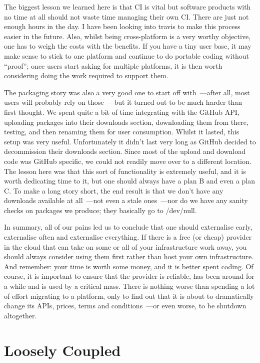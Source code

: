 \documentclass{book}
\begin{document}
The biggest lesson we learned here is that CI is vital but software
products with no time at all should not waste time managing their own
CI. There are just not enough hours in the day. I have been looking
into travis to make this process easier in the future. Also, whilst
being cross-platform is a very worthy objective, one has to weigh the
costs with the benefits. If you have a tiny user base, it may make
sense to stick to one platform and continue to do portable coding
without ``proof''; once users start asking for multiple platforms, it
is then worth considering doing the work required to support them.

The packaging story was also a very good one to start off with~---after
all, most users will probably rely on those~---but it turned out to be
much harder than first thought. We spent quite a bit of time
integrating with the GitHub API, uploading packages into their
downloads section, downloading them from there, testing, and then
renaming them for user consumption. Whilst it lasted, this setup was
very useful. Unfortunately it didn't last very long as GitHub decided
to decommission their downloads section. Since most of the upload and
download code was GitHub specific, we could not readily move over to a
different location. The lesson here was that this sort of
functionality is extremely useful, and it is worth dedicating time to
it, but one should always have a plan B and even a plan C. To make a
long story short, the end result is that we don't have any downloads
available at all~---not even a stale ones~---nor do we have any sanity
checks on packages we produce; they basically go to /dev/null.

In summary, all of our pains led us to conclude that one should
externalise early, externalise often and externalise everything. If
there is a free (or cheap) provider in the cloud that can take on some
or all of your infrastructure work away, you should always consider
using them first rather than host your own infrastructure. And
remember: your time is worth some money, and it is better spent
coding. Of course, it is important to ensure that the provider is
reliable, has been around for a while and is used by a critical
mass. There is nothing worse than spending a lot of effort migrating
to a platform, only to find out that it is about to dramatically
change its APIs, prices, terms and conditions~---or even worse, to be
shutdown altogether.

\section{Loosely Coupled}
\end{document}
